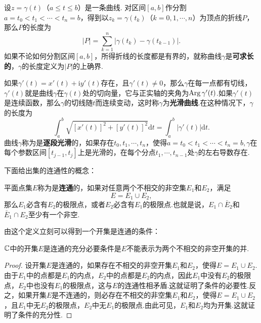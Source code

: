 设$z=\gamma(t)$（$a\le t\le b$）是一条曲线. 对区间$[a,b]$作分割$a=t_0<t_1<\cdots<t_n=b$，得到以$z_k=\gamma(t_k)$（$k=0,1,\cdots,n$）为顶点的折线$P$，那么$P$的长度为
\[
  |P| = \sum_{k=1}^n|\gamma(t_k) - \gamma(t_{k-1})|.
\]
如果不论如何分割区间$[a,b]$，所得折线的长度都是有界的，就称曲线$\gamma$是\textbf{可求长的}，$\gamma$的长度定义为$|P|$的上确界.

如果$\gamma'(t)=x'(t)+\mathrm iy'(t)$存在，且$\gamma'(t)\ne0$，那么$\gamma$在每一点都有切线，$\gamma'(t)$就是曲线$\gamma$在$\gamma(t)$处的切向量，它与正实轴的夹角为$\operatorname{Arg}\gamma'(t)$.如果$\gamma'(t)$是连续函数，那么$\gamma$的切线随$t$而连续变动，这时称$\gamma$为\textbf{光滑曲线}.在这种情况下，$\gamma$的长度为
\[\int_a^b\sqrt{[x'(t)]^2+[y'(t)]^2}\mathrm dt=\int_a^b|\gamma'(t)|\mathrm dt.\]
曲线$\gamma$称为是\textbf{逐段光滑}的，如果存在$t_0,t_1,\cdots,t_n$，使得$a=t_0<t_1<\cdots<t_n=b,\gamma$在每个参数区间$[t_{j-1},t_j]$上是光滑的，在每个分点$t_1,\cdots,t_{n-1}$处$\gamma$的左右导数存在.

下面给出集的连通性的概念：
\begin{definition}
  平面点集$E$称为是\textbf{连通}的，如果对任意两个不相交的非空集$E_1$和$E_2$，满足
  \[
  E = E_1 \cup E_2,
  \]
  那么$E_1$必含有$E_2$的极限点，或者$E_2$必含有$E_1$的极限点.也就是说，$E_1\cap\bar E_2$和$\bar E_1\cap E_2$至少有一个非空.
\end{definition}
由这个定义立刻可以得到一个开集是连通的条件：
\begin{prop}\label{prop1.6.1}
  $\mathbb C$中的开集$E$是连通的充分必要条件是$E$不能表示为两个不相交的非空开集的并.
\end{prop}
\begin{proof}
  设开集$E$是连通的，如果存在不相交的非空开集$E_1$和$E_2$，使得$E=E_1\cup E_2$.由于$E_1$中的点都是$E_1$的内点，$E_2$中的点都是$E_2$的内点，因此$E_1$中没有$E_2$的极限点，$E_2$中也没有$E_1$的极限点，这与$E$的连通性相矛盾.这就证明了条件的必要性.反之，如果开集$E$是不连通的，则必存在不相交的非空集$E_1$和$E_2$，使得$E=E_1\cup E_2$，且$E_1$中无$E_2$的极限点，$E_2$中无$E_1$的极限点.由此可见，$E_1$和$E_2$均为开集.这就证明了条件的充分性.
\end{proof}

